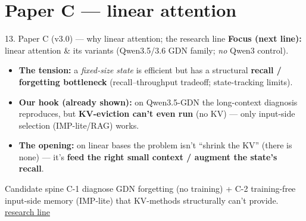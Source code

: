\documentclass[aspectratio=169]{beamer}
\newcommand{\ghbase}{https://github.com/BDeMo/research-notes/blob/main/notes/plans/08-compressed-context-memory}
\newcommand{\ghC}[2]{\href{\ghbase/papers/paper-c-linear-attention/#1}{\color{blue}\underline{#2}}}
\newcommand{\best}[1]{\textbf{#1}}
\begin{document}
\section{Paper C --- linear attention}
\begin{frame}{13. Paper C (v3.0) --- why linear attention; the research line}
  \textbf{Focus (next line):} linear attention \& its variants (Qwen3.5/3.6 GDN family; \emph{no} Qwen3 control).
  \begin{itemize}\small
    \item \textbf{The tension:} a \emph{fixed-size state} is efficient but has a structural \best{recall / forgetting bottleneck} (recall--throughput tradeoff; state-tracking limits).
    \item \textbf{Our hook (already shown):} on Qwen3.5-GDN the long-context diagnosis reproduces, but \best{KV-eviction can't even run} (no KV) --- only input-side selection (IMP-lite/RAG) works.
    \item \textbf{The opening:} on linear bases the problem isn't ``shrink the KV'' (there is none) --- it's \best{feed the right small context / augment the state's recall}.
  \end{itemize}
  \begin{block}{Candidate spine}
  \footnotesize C-1 diagnose GDN forgetting (no training) + C-2 training-free input-side memory (IMP-lite) that KV-methods structurally can't provide. \ghC{PAPER-C-research-line.md}{research line}
  \end{block}
\end{frame}
\end{document}
